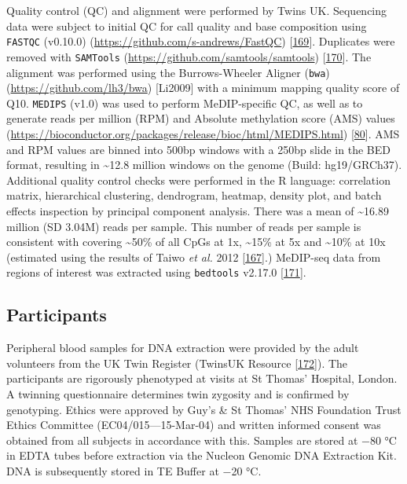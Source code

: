 \documentclass[
]{book}
\begin{document}
Quality control (QC) and alignment were performed by Twins UK.
Sequencing data were subject to initial QC for call quality and base composition using \texttt{FASTQC} (v0.10.0) (\url{https://github.com/s-andrews/FastQC}) {[}\protect\hyperlink{ref-Andrews2010}{169}{]}.
Duplicates were removed with \texttt{SAMTools} (\url{https://github.com/samtools/samtools}) {[}\protect\hyperlink{ref-Li2009b}{170}{]}.
The alignment was performed using the Burrows-Wheeler Aligner (\texttt{bwa}) (\url{https://github.com/lh3/bwa}) {[}Li2009{]} with a minimum mapping quality score of Q10.
\texttt{MEDIPS} (v1.0) was used to perform MeDIP-specific QC, as well as to generate reads per million (RPM) and Absolute methylation score (AMS) values (\url{https://bioconductor.org/packages/release/bioc/html/MEDIPS.html}) {[}\protect\hyperlink{ref-Lienhard2014}{80}{]}.
AMS and RPM values are binned into 500bp windows with a 250bp slide in the BED format, resulting in \textasciitilde12.8 million windows on the genome (Build: hg19/GRCh37).
Additional quality control checks were performed in the R language: correlation matrix, hierarchical clustering, dendrogram, heatmap, density plot, and batch effects inspection by principal component analysis.
There was a mean of \textasciitilde16.89 million (SD 3.04M) reads per sample.
This number of reads per sample is consistent with covering \textasciitilde50\% of all CpGs at 1x, \textasciitilde15\% at 5x and \textasciitilde10\% at 10x (estimated using the results of Taiwo \emph{et al.} 2012 {[}\protect\hyperlink{ref-Taiwo2012}{167}{]}.)
MeDIP-seq data from regions of interest was extracted using \texttt{bedtools} v2.17.0 {[}\protect\hyperlink{ref-Quinlan2010}{171}{]}.

\hypertarget{participants}{%
\subsection{Participants}\label{participants}}

Peripheral blood samples for DNA extraction were provided by the adult volunteers from the UK Twin Register (TwinsUK Resource {[}\protect\hyperlink{ref-Moayyeri2013}{172}{]}).
The participants are rigorously phenotyped at visits at St Thomas' Hospital, London.
A twinning questionnaire determines twin zygosity and is confirmed by genotyping.
Ethics were approved by Guy's \& St Thomas' NHS Foundation Trust Ethics Committee (EC04/015---15-Mar-04) and written informed consent was obtained from all subjects in accordance with this.
Samples are stored at −80 °C in EDTA tubes before extraction via the Nucleon Genomic DNA Extraction Kit.
DNA is subsequently stored in TE Buffer at −20 °C.
\end{document}
